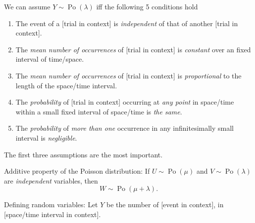 \documentclass[oneside]{book}
\begin{document}
\begin{note}
  We can assume \(Y \sim \operatorname{Po}(\lambda)\) iff the following 5 conditions hold
  \begin{enumerate}
    \item The event of a [trial in context] is \emph{independent} of that of another [trial in context].
    \item The \emph{mean number of occurrences} of [trial in context] is \emph{constant} over an fixed interval of time/space.
    \item The \emph{mean number of occurrences} of [trial in context] is \emph{proportional} to the length of the space/time interval.
    \item The \emph{probability} of [trial in context] occurring at \emph{any point} in space/time within a small fixed interval of space/time is \emph{the same}.
    \item The \emph{probability} of \emph{more than one} occurrence in any infinitesimally small interval is \emph{negligible}.  
  \end{enumerate}
  The first three assumptions are the most important.
\end{note}
\begin{note}
  Additive property of the Poisson distribution: If \(U \sim \operatorname{Po}(\mu)\) and \(V \sim \operatorname{Po}(\lambda)\) are \emph{independent} variables, then 
  \[W \sim \operatorname{Po}(\mu+\lambda).\]
\end{note}
\begin{note}
  Defining random variables: Let \(Y\) be the number of [event in context], in [space/time interval in context].  
\end{note}
\end{document}
